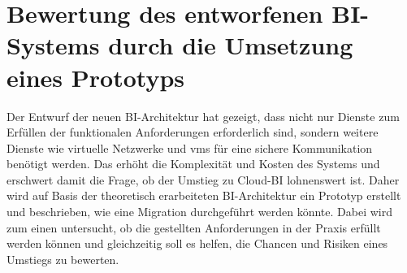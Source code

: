 \chapter{Bewertung des entworfenen BI-Systems durch die Umsetzung eines Prototyps} \label{ch:praktischeUmsetzung}
Der Entwurf der neuen BI-Architektur hat gezeigt, dass nicht nur Dienste zum Erfüllen der funktionalen Anforderungen erforderlich sind, sondern weitere Dienste wie virtuelle Netzwerke und \acp{vm} für eine sichere Kommunikation benötigt werden. Das erhöht die Komplexität und Kosten des Systems und erschwert damit die Frage, ob der Umstieg zu Cloud-BI lohnenswert ist. Daher wird auf Basis der theoretisch erarbeiteten BI-Architektur ein Prototyp erstellt und beschrieben, wie eine Migration durchgeführt werden könnte. Dabei wird zum einen untersucht, ob die gestellten Anforderungen in der Praxis erfüllt werden können und gleichzeitig soll es helfen, die Chancen und Risiken eines Umstiegs zu bewerten.




